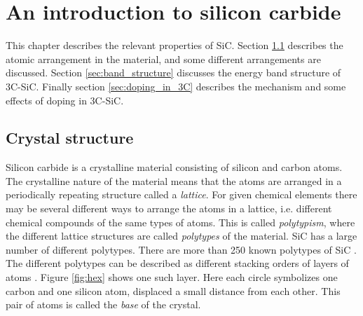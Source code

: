 





\chapter{An introduction to silicon carbide}
\label{sec:sic}
This chapter describes the relevant properties of SiC. Section \ref{sec:crystal_structure} describes the atomic arrangement in the material, and some different arrangements are discussed. Section \ref{sec:band_structure} discusses the energy band structure of 3C-SiC. Finally section \ref{sec:doping_in_3C} describes the mechanism and some effects of doping in 3C-SiC. 

\section{Crystal structure}
\label{sec:crystal_structure}
Silicon carbide is a crystalline material consisting of silicon and carbon atoms. The crystalline nature of the material means that the atoms are arranged in a periodically repeating structure called a \emph{lattice}. For given chemical elements there may be several different ways to arrange the atoms in a lattice, i.e. different chemical compounds of the same types of atoms. This is called \emph{polytypism}, where the different lattice structures are called \emph{polytypes} of the material. SiC has a large number of different polytypes. There are more than 250 known polytypes of SiC \cite{Cheung2006}. The different polytypes can be described as different stacking orders of layers of atoms \cite{Mirgorodsky1995}. Figure \ref{fig:hex} shows one such layer. Here each circle symbolizes one carbon and one silicon atom, displaced a small distance from each other. This pair of atoms is called the \emph{base} of the crystal. 

